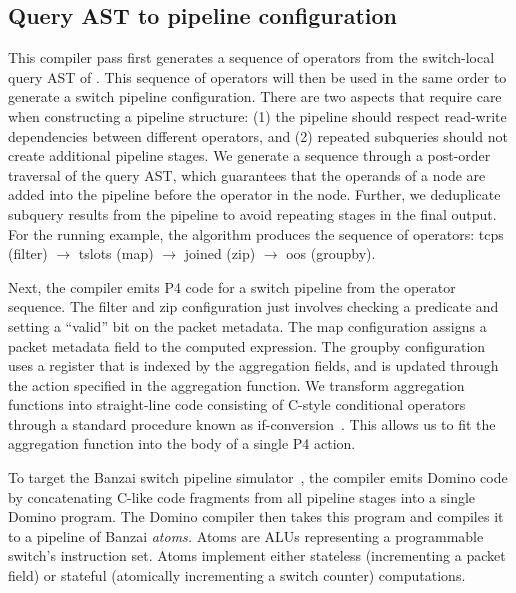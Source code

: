 \subsection{Query AST to pipeline configuration}
\label{sec:pipeline-layout}

This compiler pass first generates a sequence of operators from the
switch-local query AST of . This sequence of
operators will then be used in the same order to generate a switch pipeline
configuration. There are two aspects that require care when constructing a
pipeline structure: (1) the pipeline should respect read-write dependencies
between different operators, and (2) repeated subqueries should not create
additional pipeline stages. We generate a sequence through a post-order
traversal of the query AST, which guarantees that the operands of a node are
added into the pipeline before the operator in the node. Further, we
deduplicate subquery results from the pipeline to avoid repeating stages in the
final output. For the running example, the algorithm produces the sequence of
operators: {\ct tcps} ({\ct filter}) $\rightarrow$ {\ct tslots} ({\ct map})
$\rightarrow$ {\ct joined} ({\ct zip}) $\rightarrow$ {\ct oos} ({\ct groupby}).

Next, the compiler emits P4 code for a switch pipeline
from the operator sequence.  The {\ct filter} and {\ct zip} configuration just
involves checking a predicate and setting a ``valid'' bit on the packet
metadata. The {\ct map} configuration assigns a packet metadata field to the
computed expression. The {\ct groupby} configuration uses a register that is
indexed by the aggregation fields, and is updated through the action specified
in the aggregation function. We transform \TheSystem aggregation functions into
straight-line code consisting of C-style conditional operators through a
standard procedure known as if-conversion~\cite{if-conversion}. This allows us
to fit the aggregation function into the body of a single P4 action.

To target the Banzai switch pipeline simulator~\cite{domino_sigcomm}, the
\TheSystem compiler emits Domino code by concatenating C-like code fragments
from all pipeline stages into a single Domino program. The Domino compiler then
takes this program and compiles it to a pipeline of Banzai {\em atoms.} Atoms
are ALUs representing a programmable switch's instruction set. Atoms implement
either stateless (\eg incrementing a packet field) or stateful (\eg atomically
incrementing a switch counter) computations.

